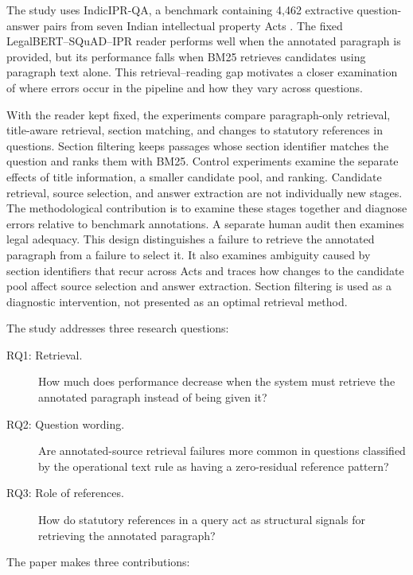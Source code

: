 \documentclass[pdflatex,sn-basic]{sn-jnl}%
\theoremstyle{thmstyleone}%
\theoremstyle{thmstyletwo}%
\theoremstyle{thmstylethree}%
\begin{document}
The study uses IndicIPR-QA, a benchmark containing 4,462 extractive
question-answer pairs from seven Indian intellectual property Acts
\citep{anonymous2026indiciprqa}. The fixed LegalBERT--SQuAD--IPR reader performs
well when the annotated paragraph is provided, but its performance falls when
BM25 retrieves candidates using paragraph text alone. This retrieval--reading
gap motivates a closer examination of where errors occur in the pipeline and
how they vary across questions.

With the reader kept fixed, the experiments compare paragraph-only retrieval,
title-aware retrieval, section matching, and changes to statutory references in
questions. Section filtering keeps passages whose section identifier matches
the question and ranks them with BM25. Control experiments examine the separate
effects of title information, a smaller candidate pool, and ranking. Candidate
retrieval, source selection, and answer extraction are not individually new
stages. The methodological contribution is to examine these stages together and
diagnose errors relative to benchmark annotations. A separate human audit then
examines legal adequacy. This design distinguishes a failure to retrieve the
annotated paragraph from a failure to select it. It also examines ambiguity
caused by section identifiers that recur across Acts and traces how changes to
the candidate pool affect source selection and answer extraction. Section
filtering is used as a diagnostic intervention, not presented as an optimal
retrieval method.

The study addresses three research questions:

\begin{description}
    \item[RQ1: Retrieval.] How much does performance decrease when the system
    must retrieve the annotated paragraph instead of being given it?

    \item[RQ2: Question wording.] Are annotated-source retrieval failures more
    common in questions classified by the operational text rule as having a
    zero-residual reference pattern?

    \item[RQ3: Role of references.] How do statutory references in a query act
    as structural signals for retrieving the annotated paragraph?
\end{description}

The paper makes three contributions:
\end{document}
